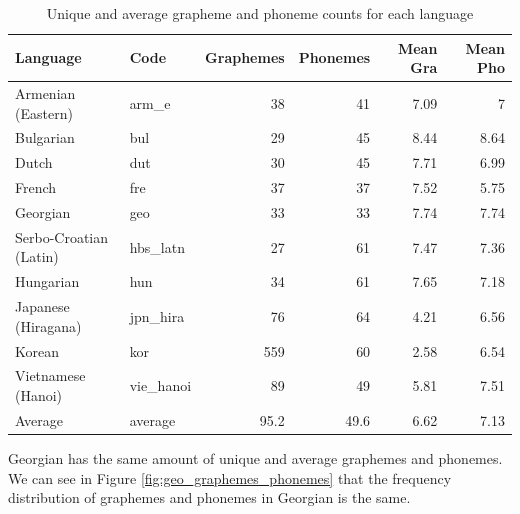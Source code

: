 \documentclass[11pt,a4paper]{article}
\begin{document}
\begin{table}[ht]
\centering
\begin{tabular}{llrrrr}
\toprule
               Language &       Code & Graphemes & Phonemes & Mean Gra & Mean Pho \\
\midrule
     Armenian (Eastern) &      arm\_e &               38 &              41 &              7.09 &                7 \\
              Bulgarian &        bul &               29 &              45 &              8.44 &             8.64 \\
                  Dutch &        dut &               30 &              45 &              7.71 &             6.99 \\
                 French &        fre &               37 &              37 &              7.52 &             5.75 \\
               Georgian &        geo &               33 &              33 &              7.74 &             7.74 \\
 Serbo-Croatian (Latin) &   hbs\_latn &               27 &              61 &              7.47 &             7.36 \\
              Hungarian &        hun &               34 &              61 &              7.65 &             7.18 \\
    Japanese (Hiragana) &   jpn\_hira &               76 &              64 &              4.21 &             6.56 \\
                 Korean &        kor &              559 &              60 &              2.58 &             6.54 \\
     Vietnamese (Hanoi) &  vie\_hanoi &               89 &              49 &              5.81 &             7.51 \\
\midrule
                Average &    average &             95.2 &            49.6 &              6.62 &             7.13 \\
\bottomrule
\end{tabular}
\caption{Unique and average grapheme and phoneme counts for each language}
\label{tab:counts}
\end{table}

Georgian has the same amount of unique and average graphemes and phonemes. We can see in Figure \ref{fig:geo_graphemes_phonemes} that the frequency distribution of graphemes and phonemes in Georgian is the same.
\end{document}
